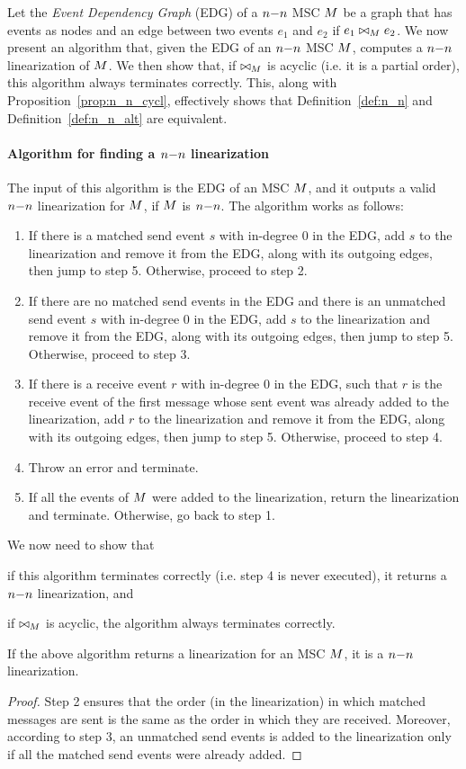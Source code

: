 Let the \emph{Event Dependency Graph} (EDG) of a $n\mathsf{-}n$ MSC $M$ be a graph that has events as nodes and an edge between two events $e_1$ and $e_2$ if $e_1 \bowtie_M e_2$. We now present an algorithm that, given the EDG of an $n\mathsf{-}n$ MSC $M$, computes a $n\mathsf{-}n$ linearization of $M$. We then show that, if $\bowtie_M$ is acyclic (i.e. it is a partial order), this algorithm always terminates correctly. This, along with Proposition~\ref{prop:n_n_cycl}, effectively shows that Definition~\ref{def:n_n} and Definition~\ref{def:n_n_alt} are equivalent.

\paragraph*{Algorithm for finding a $n\mathsf{-}n$ linearization}
The input of this algorithm is the EDG of an MSC $M$, and it outputs a valid $n\mathsf{-}n$ linearization for $M$, if $M$ is $n\mathsf{-}n$. The algorithm works as follows:
\begin{enumerate}
	\item If there is a matched send event $s$ with in-degree 0 in the EDG, add $s$ to the linearization and remove it from the EDG, along with its outgoing edges, then jump to step 5. Otherwise, proceed to step 2.
	\item If there are no matched send events in the EDG and there is an unmatched send event $s$ with in-degree 0 in the EDG, add $s$ to the linearization and remove it from the EDG, along with its outgoing edges, then jump to step 5. Otherwise, proceed to step 3.
		\item If there is a receive event $r$ with in-degree 0 in the EDG, such that $r$ is the receive event of the first message whose sent event was already added to the linearization, add $r$ to the linearization and remove it from the EDG, along with its outgoing edges, then jump to step 5. Otherwise, proceed to step 4.
		\item Throw an error and terminate.
		\item If all the events of $M$ were added to the linearization, return the linearization and terminate. Otherwise, go back to step 1.
\end{enumerate} 

We now need to show that 
\begin{enumerate*}[label={(\roman*)}]
	\item if this algorithm terminates correctly (i.e. step 4 is never executed), it returns a $n\mathsf{-}n$ linearization, and 
	\item if $\bowtie_M$ is acyclic, the algorithm always terminates correctly.
\end{enumerate*}
\begin{proposition}
	If the above algorithm returns a linearization for an MSC $M$, it is a $n\mathsf{-}n$ linearization.
\end{proposition}
\begin{proof}
	Step 2 ensures that the order (in the linearization) in which matched messages are sent is the same as the order in which they are received. Moreover, according to step 3, an unmatched send events is added to the linearization only if all the matched send events were already added.
\end{proof}

